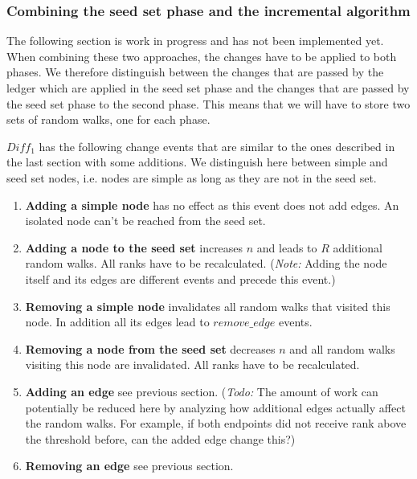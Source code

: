 \documentclass{article}
\begin{document}
\subsubsection{Combining the seed set phase and the incremental algorithm}
The following section is work in progress and has not been implemented yet.\\
When combining these two approaches, the changes have to be applied to both phases.
We therefore distinguish between the changes that are passed by the ledger which
are applied in the seed set phase and the changes that are passed by the seed set
phase to the second phase. This means that we will have to store two sets of
random walks, one for each phase.

\begin{center}
\end{center}

$Diff_1$ has the following change events that are similar to the ones described in
the last section with some additions. We distinguish here between simple and seed
set nodes, i.e. nodes are simple as long as they are not in the seed set.
\begin{enumerate}
  \item \textbf{Adding a simple node} has no effect as this event does not add edges. An
  isolated node can't be reached from the seed set.
  \item \textbf{Adding a node to the seed set} increases $n$ and leads to $R$ additional
  random walks. All ranks have to be recalculated. (\textit{Note:} Adding
  the node itself and its edges are different events and precede this event.)
  \item \textbf{Removing a simple node} invalidates all random walks that visited
  this node. In addition all its edges lead to $remove\_edge$ events.
  \item \textbf{Removing a node from the seed set} decreases $n$ and all random
  walks visiting this node are invalidated. All ranks have to be recalculated.
  \item \textbf{Adding an edge} see previous section. (\textit{Todo:} The amount
  of work can potentially be reduced here by analyzing how additional edges actually
  affect the random walks. For example, if both endpoints did not receive rank
  above the threshold before, can the added edge change this?)
  \item \textbf{Removing an edge} see previous section.
\end{enumerate}
\end{document}
